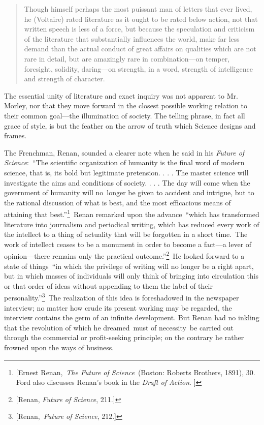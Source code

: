 \documentclass[openany,nobib]{tufte-book}
\begin{document}
\begin{quote}
Though himself perhaps the most puissant man of letters that ever lived,
he (Voltaire) rated literature as it ought to be rated below action, not
that written speech is less of a force, but because the speculation and
criticism of the literature that substantially influences the world,
make far less demand than the actual conduct of great affairs on
qualities which are not rare in detail, but are amazingly rare in
combination---on temper, foresight, solidity, daring---on strength, in a
word, strength of intelligence and strength of character.~
\end{quote}

\noindent The essential unity of literature and exact inquiry was not apparent to
Mr. Morley, nor that they move forward in the closest possible working
relation to their common goal---the illumination of society. The telling
phrase, in fact all grace of style, is but the feather on the arrow of
truth which Science designs and frames.~

The Frenchman, Renan, sounded a clearer note when he said in his
\emph{Future of Science}:~``The scientific organization of humanity is
the final word of modern science, that is, its bold but legitimate
pretension. . . . The master science will investigate the aims and
conditions of society. . . . The day will come when the government of
humanity will no~longer be given to accident and intrigue, but to the
rational discussion of what is best, and the most efficacious means of
attaining that best.''\footnote{{[}Ernest Renan,~\emph{The Future of
  Science}~(Boston: Roberts Brothers, 1891), 30. Ford also discusses
  Renan's book in the \emph{Draft of Action}. {]}}~Renan remarked upon
the advance~``which has transformed literature into journalism and
periodical writing, which has reduced every work of the intellect to a
thing of actuality that will be forgotten in a short time.~The work of
intellect ceases to be a monument in order to become a fact---a lever of
opinion---there remains only the practical outcome.''\footnote{{[}Renan,
  \emph{Future of Science}, 211.{]}}~He looked forward to a state of
things~``in which the privilege of writing will no longer be a right
apart, but in which masses of individuals will only think of bringing
into circulation this or that order of ideas without appending to them
the label of their personality.''\footnote{{[}Renan,~\emph{Future of
  Science}, 212.{]}}~The realization of this idea is foreshadowed in the
newspaper interview; no matter how crude its present working may be
regarded, the interview contains the germ of an infinite development.
But Renan had no inkling that the revolution of which he dreamed~must of
necessity~be carried out through the commercial or profit-seeking
principle; on the contrary he rather frowned upon the ways of business.~
\end{document}
